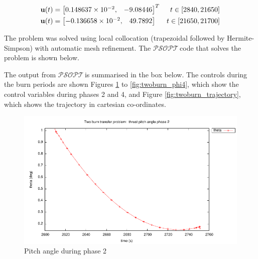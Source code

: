 \documentclass[a4paper,11pt]{report}    %
\newcommand{\psopt}{$\mathcal{PSOPT}$\,}  %
\newcommand{\mt}[1]{\ensuremath \mathbf{#1}}
\newenvironment{shadedframe}{%
  \def\FrameCommand{\fcolorbox{black}{shadecolor}}%
  \MakeFramed {\FrameRestore}}
{\endMakeFramed}
\begin{document}
\begin{equation}
  \begin{aligned}
     \mt{u}(t) & = \begin{bmatrix} 0.148637\times 10^{-2}, & -9.08446 \end{bmatrix}^T  &  t \in [2840, 21650] \\
     \mt{u}(t) & = \begin{bmatrix} -0.136658 \times 10^{-2},  & 49.7892 \end{bmatrix}  &  t \in [21650, 21700] \\
  \end{aligned}
\end{equation}



The problem was solved using local collocation (trapezoidal followed by Hermite-Simpson) with automatic mesh refinement.  The \psopt code
that solves the problem is shown below.

\tiny
\begin{shadedframe}

\end{shadedframe}
\normalsize

The output from \psopt is summarised in the box below. The controls during the burn periods are shown  Figures \ref{fig:twoburn_theta2} to \ref{fig:twoburn_phi4},
which show the control variables during phases 2 and 4, and Figure \ref{fig:twoburn_trajectory}, which shows the trajectory in cartesian co-ordinates.

\begin{shadedframe}

\end{shadedframe}





\begin{figure}
  \centering 
  \includegraphics{../examples/twoburn/theta2}
  \caption{Pitch angle during phase 2}
 \label{fig:twoburn_theta2}
\end{figure}
\end{document}
